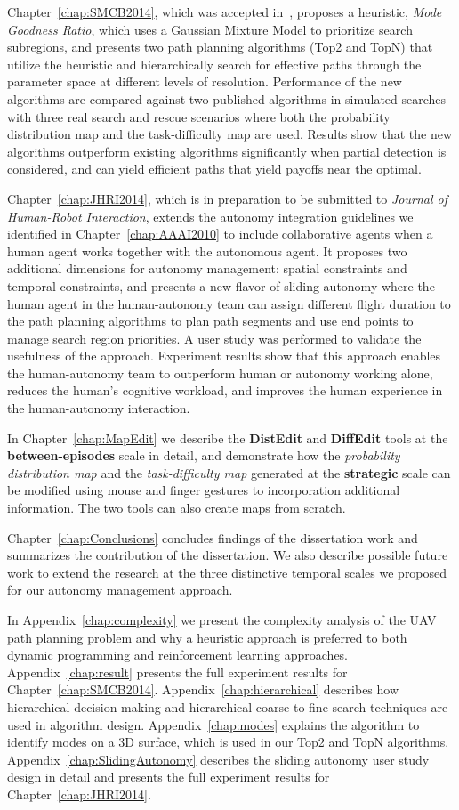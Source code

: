 Chapter~\ref{chap:SMCB2014}, which was accepted in~\cite{Lin2014Hierarchical}, proposes a heuristic, \textit{Mode Goodness Ratio}, which uses a Gaussian Mixture Model to prioritize search subregions, and presents two path planning algorithms (Top2 and TopN) that utilize the heuristic and hierarchically search for effective paths through the parameter space at different levels of resolution. Performance of the new algorithms are compared against two published algorithms in simulated searches with three real search and rescue scenarios where both the probability distribution map and the task-difficulty map are used. Results show that the new algorithms outperform existing algorithms significantly when partial detection is considered, and can yield efficient paths that yield payoffs near the optimal. 

Chapter~\ref{chap:JHRI2014}, which is in preparation to be submitted to \textit{Journal of Human-Robot Interaction}, extends the autonomy integration guidelines we identified in Chapter~\ref{chap:AAAI2010} to include collaborative agents when a human agent works together with the autonomous agent. It proposes two additional dimensions for autonomy management: spatial constraints and temporal constraints, and presents a new flavor of sliding autonomy where the human agent in the human-autonomy team can assign different flight duration to the path planning algorithms to plan path segments and use end points to manage search region priorities. A user study was performed to validate the usefulness of the approach. Experiment results show that this approach enables the human-autonomy team to outperform human or autonomy working alone, reduces the human's cognitive workload, and improves the human experience in the human-autonomy interaction.

In Chapter~\ref{chap:MapEdit} we describe the \textbf{DistEdit} and \textbf{DiffEdit} tools at the \textbf{between-episodes} scale in detail, and demonstrate how the \textit{probability distribution map} and the \textit{task-difficulty map} generated at the \textbf{strategic} scale can be modified using mouse and finger gestures to incorporation additional information. The two tools can also create maps from scratch.

Chapter~\ref{chap:Conclusions} concludes findings of the dissertation work and summarizes the contribution of the dissertation. 
We also describe possible future work to extend the research at the three distinctive temporal scales we proposed for our autonomy management approach.

In Appendix~\ref{chap:complexity} we present the complexity analysis of the UAV path planning problem and why a heuristic approach is preferred to both dynamic programming and reinforcement learning approaches. Appendix~\ref{chap:result} presents the full experiment results for Chapter~\ref{chap:SMCB2014}. Appendix~\ref{chap:hierarchical} describes how hierarchical decision making and hierarchical coarse-to-fine search techniques are used in algorithm design. Appendix~\ref{chap:modes} explains the algorithm to identify modes on a 3D surface, which is used in our Top2 and TopN algorithms. Appendix~\ref{chap:SlidingAutonomy} describes the sliding autonomy user study design in detail and presents the full experiment results for Chapter~\ref{chap:JHRI2014}.